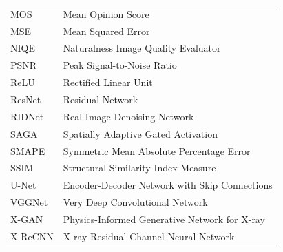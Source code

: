 \begin{longtable}{@{}p{3.5cm}p{10cm}@{}}
  MOS      & Mean Opinion Score \\
  MSE      & Mean Squared Error \\
  NIQE     & Naturalness Image Quality Evaluator \\
  PSNR     & Peak Signal-to-Noise Ratio \\
  ReLU     & Rectified Linear Unit \\
  ResNet   & Residual Network \\
  RIDNet   & Real Image Denoising Network \\
  SAGA     & Spatially Adaptive Gated Activation \\
  SMAPE    & Symmetric Mean Absolute Percentage Error \\
  SSIM     & Structural Similarity Index Measure \\
  U-Net    & Encoder-Decoder Network with Skip Connections \\
  VGGNet   & Very Deep Convolutional Network \\
  X-GAN    & Physics-Informed Generative Network for X-ray \\
  X-ReCNN  & X-ray Residual Channel Neural Network \\
\end{longtable}
